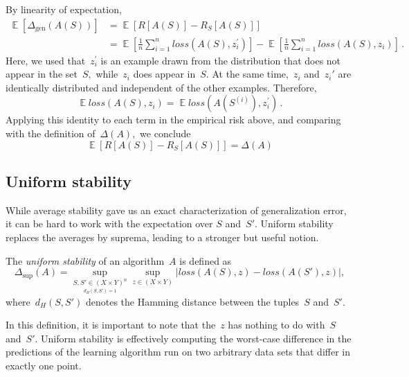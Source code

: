 \documentclass{tufte-book}
\begin{document}
\begin{Proof}

By linearity of expectation, \[
\begin{aligned}
\mathop\mathbb{E}[\Delta_{\mathrm{gen}}(A(S))]
&= \mathop\mathbb{E}\left[R[A(S)] - R_S[A(S)]\right] \\
&= \mathop\mathbb{E}\left[\frac{1}{n}\sum_{i=1}^{n}\mathit{loss}(A(S),z_i^{\prime})\right]
- \mathop\mathbb{E}\left[\frac{1}{n}\sum_{i=1}^{n}\mathit{loss}(A(S),z_i)\right]\,.
\end{aligned}
\] Here, we used that~\(z_i^\prime\) is an example drawn from the
distribution that does not appear in the set~\(S,\) while~\(z_i\) does
appear in~\(S.\) At the same time,~\(z_i\) and~\(z_i'\) are identically
distributed and independent of the other examples. Therefore, \[
\mathop\mathbb{E}\mathit{loss}(A(S),z_i) = \mathop\mathbb{E}\mathit{loss}(A(S^{(i)}),z_i^{\prime})\,.
\] Applying this identity to each term in the empirical risk above, and
comparing with the definition of~\(\Delta(A),\) we conclude \[
\mathop\mathbb{E}[R[A(S)] - R_S[A(S)]] = \Delta(A)
\]

\end{Proof}

\hypertarget{uniform-stability}{%
\subsection{Uniform stability}\label{uniform-stability}}

While average stability gave us an exact characterization of
generalization error, it can be hard to work with the expectation over
\(S\) and~\(S'.\) Uniform stability replaces the averages by suprema,
leading to a stronger but useful notion.


\begin{Definition}

The \emph{uniform stability} of an algorithm~\(A\) is defined as \[
\Delta_{\mathrm{sup}}(A) = \sup_{\underset{d_H(S, S')=1}{S, S' \in (X\times Y)^n}}
\sup_{z\in(X\times Y)} |\mathit{loss}(A(S), z) - \mathit{loss}(A(S'), z)|,
\] where~\(d_H(S,S')\) denotes the Hamming distance between the
tuples~\(S\) and~\(S'\).

\end{Definition}

In this definition, it is important to note that the~\(z\) has nothing
to do with~\(S\) and~\(S'\). Uniform stability is effectively computing
the worst-case difference in the predictions of the learning algorithm
run on two arbitrary data sets that differ in exactly one point.
\end{document}
